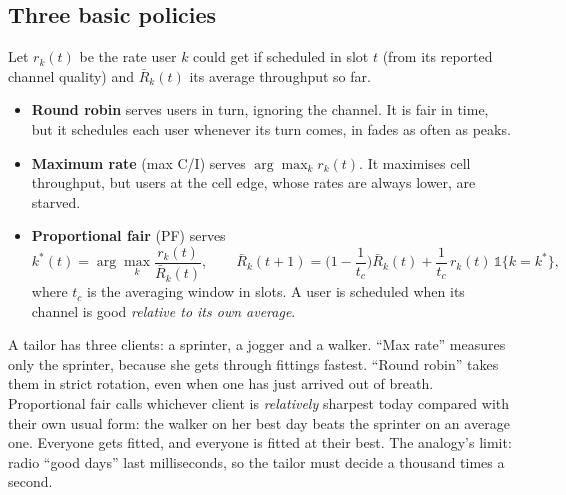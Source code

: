 \subsection{Three basic policies}

Let $r_k(t)$ be the rate user $k$ could get if scheduled in slot $t$ (from its reported channel quality) and $\bar R_k(t)$
its average throughput so far.
\begin{itemize}
\item \textbf{Round robin} serves users in turn, ignoring the channel. It is fair in time, but it schedules each user
whenever its turn comes, in fades as often as peaks.
\item \textbf{Maximum rate} (max C/I) serves $\arg\max_k r_k(t)$. It maximises cell throughput, but users at the cell edge,
whose rates are always lower, are starved.
\item \textbf{Proportional fair} (PF) serves
\begin{equation}
k^*(t)=\arg\max_k\frac{r_k(t)}{\bar R_k(t)},\qquad
\bar R_k(t+1)=\Big(1-\frac1{t_c}\Big)\bar R_k(t)+\frac1{t_c}\,r_k(t)\,\mathbb 1\{k=k^*\},
\label{eq:ch20:pf}
\end{equation}
where $t_c$ is the averaging window in slots. A user is scheduled when its channel is good \emph{relative to its own
average}.
\end{itemize}

\begin{analogy}
A tailor has three clients: a sprinter, a jogger and a walker. ``Max rate'' measures only the sprinter, because she
gets through fittings fastest. ``Round robin'' takes them in strict rotation, even when one has just arrived out of
breath. Proportional fair calls whichever client is \emph{relatively} sharpest today compared with their own usual
form: the walker on her best day beats the sprinter on an average one. Everyone gets fitted, and everyone is fitted
at their best. The analogy's limit: radio ``good days'' last milliseconds, so the tailor must decide a thousand
times a second.
\end{analogy}


